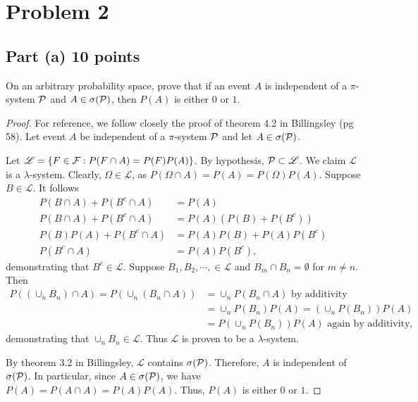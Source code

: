 \documentclass[letterpaper, 12pt]{article}
\newcommand{\Fc}{{\cal F}}
\newcommand{\Pc}{{\cal P}}
\newcommand{\Ls}{\mathscr{L}}
\begin{document}
\section*{Problem 2}
\subsection*{Part (a) 10 points}
On an arbitrary probability space, prove that if an event $A$ is independent of a $\pi$-system $\Pc$ and $A \in \sigma(\Pc)$, then $P(A)$ is either $0$ or $1$.

\begin{proof}
For reference, we follow closely the proof of theorem 4.2 in Billingsley (pg 58).
Let event $A$ be independent of a $\pi$-system $\Pc$ and let $A \in \sigma(\Pc)$. 


Let $\Ls = \{ F \in \Fc : P(F \cap A) = P(F)P(A)\}$. By hypothesis, $\Pc \subset \Ls$. We claim $\Ls$ is a $\lambda$-system. Clearly, $\Omega \in \Ls$, as $P(\Omega \cap A) = P(A) = P(\Omega)P(A)$. Suppose $B \in \Ls$. It follows
\begin{align*}
P(B \cap A) + P(B^c \cap A) &= P(A) \\
P(B \cap A) + P(B^c \cap A) &= P(A)(P(B) + P(B^c) )\\
P(B)P(A) + P(B^c \cap A) &= P(A)P(B) + P(A)P(B^c) \\
P(B^c \cap A) &=P(A)P(B^c)
\text{,}
\end{align*}
demonstrating that $B^c \in \Ls$. Suppose $B_1, B_2, \cdots, \in \Ls $ and $B_m \cap B_n = \emptyset$ for $m \neq n$. Then
\begin{align*}
P\left((\cup_n B_n) \cap A\right) 
= P\left(\cup_n (B_n \cap A)\right) 
&= \cup_n P(B_n \cap A) 
\text{ by additivity} \\
&= \cup_n P(B_n) P( A)
= (\cup_n P(B_n)) P(A) \\
&= P(\cup_n P(B_n))P(A) 
\text{ again by additivity,}
\end{align*}
demonstrating that $\cup_n B_n \in \Ls$. Thus $\Ls$ is proven to be a $\lambda$-system.

By theorem 3.2 in Billingsley, $\Ls$ contains $\sigma(\Pc)$. Therefore, $A$ is independent of $\sigma(\Pc)$. In particular, since $A \in \sigma(\Pc)$, we have $P(A) = P(A \cap A) = P(A)P(A)$. Thus, $P(A)$ is either $0$ or $1$.
\end{proof}
\end{document}
